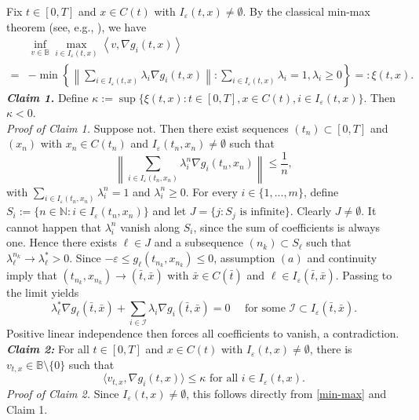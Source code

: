 \documentclass[preprint,12pt]{elsarticle}
\renewcommand{\epsilon}{\varepsilon}
\newcommand{\N}{\mathbb{N}}
\theoremstyle{plain}
\theoremstyle{definition}
\theoremstyle{remark}
\begin{document}
Fix $t\in [0,T]$ and $x\in  C(t)$ with $I_\epsilon(t,x)\neq \emptyset$. By the classical min-max theorem (see, e.g., \cite[Lemma 1.85]{MR2986672}), we have
 \begin{equation}\label{min-max}
 	\begin{aligned}
 		&\inf_{v\in \mathbb{B}}\max_{i\in I_\epsilon(t,x)}\left\langle v,\nabla g_i(t,x)\right\rangle\\ 
 		=& -\min\left\{\left\|\sum_{i\in I_\epsilon(t,x)}\lambda_i \nabla g_i(t,x)\right\| : \sum_{i\in I_\epsilon(t,x)}\lambda_i = 1, \lambda_i\geq 0\right\}=:\xi(t,x).
 	\end{aligned}
 \end{equation}
 \emph{\textbf{Claim 1.}} Define $\kappa := \sup\{\xi(t,x) : t\in [0,T], x\in C(t), i\in I_\epsilon(t,x)\}$. Then $\kappa<0$.\\
 \emph{Proof of Claim 1.} Suppose not.  Then there exist sequences $(t_n)\subset [0,T]$ and $(x_n)$ with $x_n\in C(t_n)$ and $I_\epsilon(t_n,x_n)\neq \emptyset$ such that 
 \begin{equation*}
 	\left\|\sum_{i\in I_\epsilon(t_n,x_n)}\lambda_i^n\nabla g_i(t_n,x_n)\right\|\leq \frac{1}{n},
 \end{equation*}
 with $\sum_{i\in I_\epsilon(t_n,x_n)} \lambda_i^n = 1$ and $\lambda_i^n\geq 0$. For every $i\in \{1,...,m\}$, define $S_i := \{n\in \N : i\in I_\epsilon(t_n,x_n)\}$ and let $J = \{j : S_j \text{ is infinite}\}$. Clearly $J\neq \emptyset$. It cannot happen that $\lambda_i^n$ vanish along $S_i$, since the sum of coefficients is always one. Hence  there exists $\ell\in J$ and a subsequence $(n_k)\subset S_{\ell}$ such that $ \lambda_\ell^{n_k} \to \lambda_{\ell}^{\ast}>0$. Since $-\epsilon\leq g_\ell(t_{n_k},x_{n_k})\leq 0$, assumption $(a)$ and continuity imply that  $(t_{n_k},x_{n_k}) \to (\bar t,\bar x)$ with $\bar x\in C(\bar t)$ and $\ell \in I_\epsilon(\bar t,\bar x)$. Passing to the limit yields
 $$\lambda_\ell^\ast\nabla g_\ell(\bar t,\bar x) + \sum_{i\in\mathscr{I}} \lambda_i\nabla g_i(\bar t,\bar x) = 0 \quad \textrm{ for some } \mathscr{I}\subset I_\epsilon(\bar t,\bar x).$$
Positive linear independence then forces all coefficients to vanish, a contradiction.\\
\emph{\textbf{Claim 2:}} For all $t\in [0,T]$ and $x\in C(t)$ with $I_\epsilon(t,x)\neq \emptyset$, there is $v_{t,x}\in \mathbb{B}\setminus \{0\}$ such that 
 $$
 \langle v_{t,x},\nabla g_i(t,x)\rangle\leq \kappa \textrm{ for all } i\in I_\epsilon(t,x).
 $$
\noindent \emph{Proof of Claim 2.} Since $I_\epsilon(t,x)\neq \emptyset$, this follows directly from \eqref{min-max} and Claim 1.\\
\end{document}

